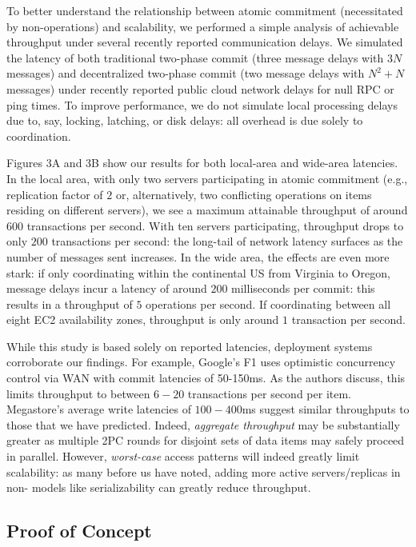 To better understand the relationship between atomic commitment
(necessitated by non-\iconfluent operations) and scalability, we
performed a simple analysis of achievable throughput under several
recently reported communication delays. We simulated the latency of
both traditional two-phase commit (three message delays with $3N$
messages) and decentralized two-phase commit (two message delays with
$N^2+N$ messages) under recently reported public cloud network delays
for null RPC or ping times. To improve performance, we do not simulate
local processing delays due to, say, locking, latching, or disk
delays: all overhead is due solely to coordination.

Figures 3A and 3B show our results for both local-area and wide-area
latencies.  In the local area, with only two servers participating in
atomic commitment (e.g., replication factor of $2$ or, alternatively,
two conflicting operations on items residing on different servers), we
see a maximum attainable throughput of around $600$ transactions per
second. With ten servers participating, throughput drops to only $200$
transactions per second: the long-tail of network latency surfaces as
the number of messages sent increases. In the wide area, the effects
are even more stark: if only coordinating within the continental US
from Virginia to Oregon, message delays incur a latency of around
$200$ milliseconds per commit: this results in a throughput of $5$
operations per second. If coordinating between all eight EC2
availability zones, throughput is only around $1$ transaction per
second.

While this study is based solely on reported latencies, deployment
systems corroborate our findings. For example, Google's F1 uses
optimistic concurrency control via WAN with commit latencies of
50-150ms. As the authors discuss, this limits throughput to between
$6-20$ transactions per second per item. Megastore's average write
latencies of $100-400$ms suggest similar throughputs to those that we
have predicted. Indeed, \textit{aggregate throughput} may be
substantially greater as multiple 2PC rounds for disjoint sets of data
items may safely proceed in parallel. However, \textit{worst-case}
access patterns will indeed greatly limit scalability: as many before
us have noted, adding more active servers/replicas in non-\cfree
models like serializability can greatly reduce throughput.

\subsection{Proof of Concept}

